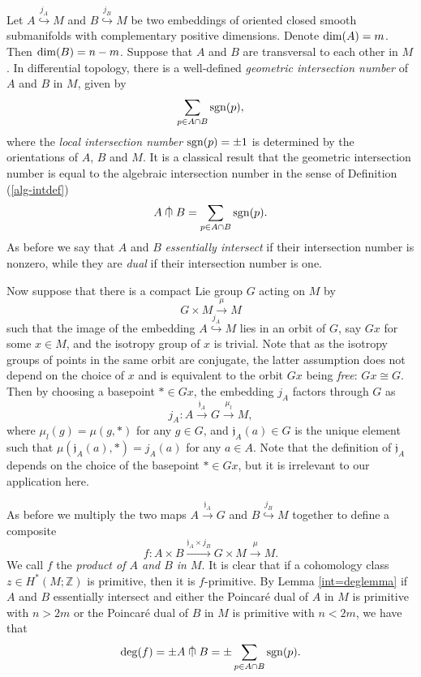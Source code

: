 \documentclass[a4]{amsart}
\theoremstyle{definition}
\newcommand{\testcap}{\mathrel{\vcenter{\offinterlineskip
\hbox{$\cap$}\vskip-1.8ex\hbox{$\kern0.2em | \kern0.15em$}}}}
\begin{document}
\begin{sloppypar}
Let $A\stackrel{j_A}{\hookrightarrow} M$ and $B\stackrel{j_B}{\hookrightarrow} M$ be two embeddings of oriented closed smooth submanifolds with complementary positive dimensions. Denote ${\rm dim}(A)=m$. Then ${\rm dim}(B)=n-m$. Suppose that $A$ and $B$ are transversal to each other in $M$. In differential topology, there is a well-defined {\it geometric intersection number} of $A$ and $B$ in $M$, given by 
\[
\sum\limits_{p\in A\cap B} {\rm sgn}(p),
\]
where the {\it local intersection number} ${\rm sgn}(p)=\pm 1$ is determined by the orientations of $A$, $B$ and $M$. It is a classical result that the geometric intersection number is equal to the algebraic intersection number in the sense of Definition (\ref{alg-intdef})
\[
A\testcap B=\sum\limits_{p\in A\cap B} {\rm sgn}(p).
\]
As before we say that $A$ and $B$ {\it essentially intersect} if their intersection number is nonzero, while they are {\it dual} if their intersection number is one. 

Now suppose that there is a compact Lie group $G$ acting on $M$ by 
\[
G\times M\stackrel{\mu}{\longrightarrow} M
\]
such that the image of the embedding $A\stackrel{j_A}{\hookrightarrow} M$ lies in an orbit of $G$, say $Gx$ for some $x\in M$, and the isotropy group of $x$ is trivial. Note that as the isotropy groups of points in the same orbit are conjugate, the latter assumption does not depend on the choice of $x$ and is equivalent to the orbit $Gx$ being {\it free}: $Gx\cong G$.  
Then by choosing a basepoint $\ast\in Gx$, the embedding $j_A$ factors through $G$ as
\[
j_A: A\stackrel{\mathfrak{j}_A}{\longrightarrow} G\stackrel{\mu_l}{\longrightarrow} M,
\]  
where $\mu_l(g)=\mu(g, \ast)$ for any $g\in G$, and $\mathfrak{j}_A(a)\in G$ is the unique element such that $\mu(\mathfrak{j}_A(a), \ast)=j_A(a)$ for any $a\in A$. Note that the definition of $\mathfrak{j}_A$ depends on the choice of the basepoint $\ast\in Gx$, but it is irrelevant to our application here. 

As before we multiply the two maps $A\stackrel{\mathfrak{j}_A}{\longrightarrow} G$ and $B\stackrel{j_B}{\hookrightarrow} M$ together to define a composite 
\begin{equation}\label{smintABfeq}
f: A\times B \stackrel{\mathfrak{j}_A\times j_B}{\longrightarrow} G\times M\stackrel{\mu}{\longrightarrow} M.
\end{equation}
We call $f$ the {\it product of $A$ and $B$ in $M$}. It is clear that if a cohomology class $z\in H^\ast(M;\mathbb{Z})$ is primitive, then it is $f$-primitive. 
By Lemma \ref{int=deglemma} if $A$ and $B$ essentially intersect and either the Poincar\'{e} dual of $A$ in $M$ is primitive with $n>2m$ or the Poincar\'{e} dual of $B$ in $M$ is primitive with $n<2m$, we have that 
\[
{\rm deg}(f)=\pm A\testcap B=\pm \sum\limits_{p\in A\cap B} {\rm sgn}(p).
\]


\end{sloppypar}
\end{document}
